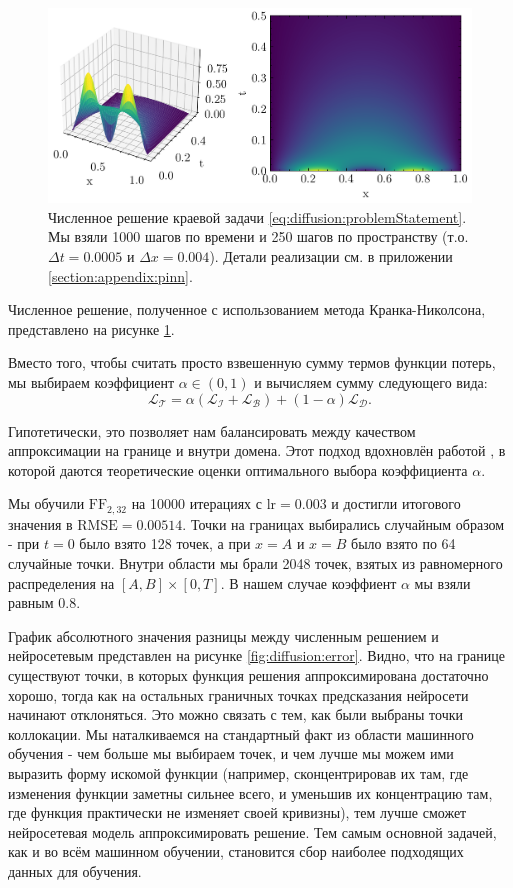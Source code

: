 \documentclass[a4paper, 12pt]{article}
\begin{document}
\begin{figure}
    \centering
    \includegraphics{../Differential Equation Solution/images/diffusion/Numerical solution.png}
    \caption{Численное решение краевой задачи \ref{eq:diffusion:problemStatement}. Мы взяли 1000 шагов по времени и 250 шагов по пространству (т.о. $\Delta t = 0.0005$ и $\Delta x = 0.004$). Детали реализации см. в приложении \ref{section:appendix:pinn}.}
    \label{fig:diffusion:numerical}
\end{figure}

Численное решение, полученное с использованием метода Кранка-Николсона, представлено на рисунке \ref{fig:diffusion:numerical}. 

Вместо того, чтобы считать просто взвешенную сумму термов функции потерь, мы выбираем коэффициент $\alpha \in (0, 1)$ и вычисляем сумму следующего вида:
$$
\mathcal{L_T} = \alpha (\mathcal{L_I} + \mathcal{L_B}) + (1 - \alpha) \mathcal{L_D}.
$$

Гипотетически, это позволяет нам балансировать между качеством аппроксимации на границе и внутри домена. Этот подход вдохновлён работой \cite{vandermeer2021optimally}, в которой даются теоретические оценки оптимального выбора коэффициента $\alpha$.

Мы обучили $\mathrm{FF}_{2, 32}$ на 10000 итерациях с $\mathrm{lr} = 0.003$ и достигли итогового значения в $\mathrm{RMSE} = 0.00514$. Точки на границах выбирались случайным образом - при $t = 0$ было взято 128 точек, а при $x = A$ и $x = B$ было взято по 64 случайные точки. Внутри области мы брали 2048 точек, взятых из равномерного распределения на $[A, B] \times [0, T]$. В нашем случае коэффиент $\alpha$ мы взяли равным $0.8$. 

График абсолютного значения разницы между численным решением и нейросетевым представлен на рисунке \ref{fig:diffusion:error}. Видно, что на границе существуют точки, в которых функция решения аппроксимирована достаточно хорошо, тогда как на остальных граничных точках предсказания нейросети начинают отклоняться. Это можно связать с тем, как были выбраны точки коллокации. Мы наталкиваемся на стандартный факт из области машинного обучения - чем больше мы выбираем точек, и чем лучше мы можем ими выразить форму искомой функции (например, сконцентрировав их там, где изменения функции заметны сильнее всего, и уменьшив их концентрацию там, где функция практически не изменяет своей кривизны), тем лучше сможет нейросетевая модель аппроксимировать решение. Тем самым основной задачей, как и во всём машинном обучении, становится сбор наиболее подходящих данных для обучения.
\end{document}
